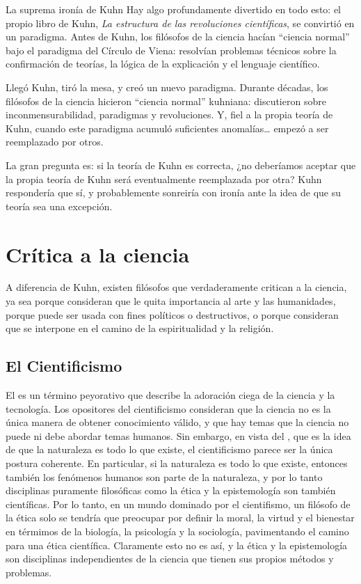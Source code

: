 \begin{digress}{La suprema ironía de Kuhn}
	Hay algo profundamente divertido en todo esto: el propio libro de Kuhn, \emph{La estructura de las revoluciones científicas}, se convirtió en un paradigma.
	Antes de Kuhn, los filósofos de la ciencia hacían “ciencia normal” bajo el paradigma del Círculo de Viena: resolvían problemas técnicos sobre la confirmación de teorías, la lógica de la explicación y el lenguaje científico.

	Llegó Kuhn, tiró la mesa, y creó un nuevo paradigma.
	Durante décadas, los filósofos de la ciencia hicieron “ciencia normal” kuhniana: discutieron sobre inconmensurabilidad, paradigmas y revoluciones.
	Y, fiel a la propia teoría de Kuhn, cuando este paradigma acumuló suficientes anomalías… empezó a ser reemplazado por otros.

	La gran pregunta es: si la teoría de Kuhn es correcta, ¿no deberíamos aceptar que la propia teoría de Kuhn será eventualmente reemplazada por otra?
	Kuhn respondería que sí, y probablemente sonreiría con ironía ante la idea de que su teoría sea una excepción.
\end{digress}

\section{Crítica a la ciencia}
\label{sec:criticaalaciencia}
A diferencia de Kuhn, existen filósofos que verdaderamente critican a la ciencia, ya sea porque consideran que le quita importancia al arte y las humanidades, porque puede ser usada con fines políticos o destructivos, o porque consideran que se interpone en el camino de la espiritualidad y la religión.

\subsection*{El Cientificismo}
\label{sub:cientificismo}
El  es un término peyorativo que describe la adoración ciega de la ciencia y la tecnología.
Los opositores del cientificismo consideran que la ciencia no es la única manera de obtener conocimiento válido, y que hay temas que la ciencia no puede ni debe abordar temas humanos.
Sin embargo, en vista del , que es la idea de que la naturaleza es todo lo que existe, el cientificismo parece ser la única postura coherente.
En particular, si la naturaleza es todo lo que existe, entonces también los fenómenos humanos son parte de la naturaleza, y por lo tanto disciplinas puramente filosóficas como la ética y la epistemología son también científicas.
Por lo tanto, en un mundo dominado por el cientifismo, un filósofo de la ética solo se tendría que preocupar por definir la moral, la virtud y el bienestar en térmimos de la biología, la psicología y la sociología, pavimentando el camino para una ética científica.
Claramente esto no es así, y la ética y la epistemología son disciplinas independientes de la ciencia que tienen sus propios métodos y problemas.

